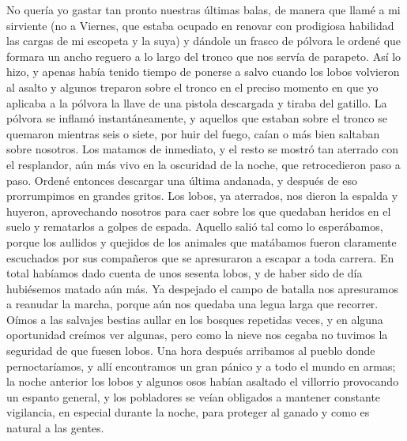 \documentclass{novela}
\begin{document}
    No quería yo gastar tan pronto nuestras últimas balas, de manera que llamé a mi sirviente (no a Viernes, que estaba ocupado en renovar con prodigiosa habilidad las cargas de mi escopeta y la suya) y dándole un frasco de pólvora le ordené que formara un ancho reguero a lo largo del tronco que nos servía de parapeto. Así lo hizo, y apenas había tenido tiempo de ponerse a salvo cuando los lobos volvieron al asalto y algunos treparon sobre el tronco en el preciso momento en que yo aplicaba a la pólvora la llave de una pistola descargada y tiraba del gatillo. La pólvora se inflamó instantáneamente, y aquellos que estaban sobre el tronco se quemaron mientras seis o siete, por huir del fuego, caían o más bien saltaban sobre nosotros. Los matamos de inmediato, y el resto se mostró tan aterrado con el resplandor, aún más vivo en la oscuridad de la noche, que retrocedieron paso a paso. Ordené entonces descargar una última andanada, y después de eso prorrumpimos en grandes gritos. Los lobos, ya aterrados, nos dieron la espalda y huyeron, aprovechando nosotros para caer sobre los que quedaban heridos en el suelo y rematarlos a golpes de espada. Aquello salió tal como lo esperábamos, porque los aullidos y quejidos de los animales que matábamos fueron claramente escuchados por sus compañeros que se apresuraron a escapar a toda carrera.
    En total habíamos dado cuenta de unos sesenta lobos, y de haber sido de día hubiésemos matado aún más. Ya despejado el campo de batalla nos apresuramos a reanudar la marcha, porque aún nos quedaba una legua larga que recorrer. Oímos a las salvajes bestias aullar en los bosques repetidas veces, y en alguna oportunidad creímos ver algunas, pero como la nieve nos cegaba no tuvimos la seguridad de que fuesen lobos.
    Una hora después arribamos al pueblo donde pernoctaríamos, y allí encontramos un gran pánico y a todo el mundo en armas; la noche anterior los lobos y algunos osos habían asaltado el villorrio provocando un espanto general, y los pobladores se veían obligados a mantener constante vigilancia, en especial durante la noche, para proteger al ganado y como es natural a las gentes.
\end{document}
